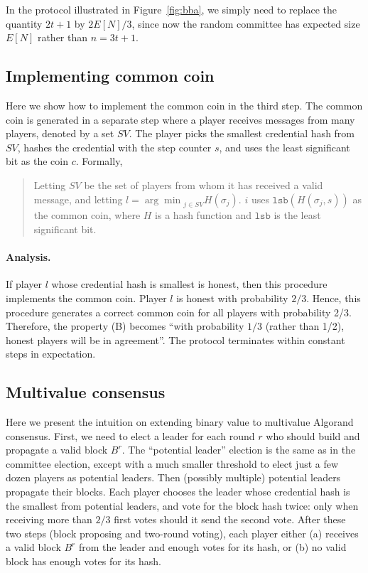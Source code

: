\documentclass{article}
\begin{document}
In the protocol illustrated in Figure~\ref{fig:bba}, we simply need to replace the quantity $2t+1$ by $2 E[N]/3$, since now the random committee has expected size $E[N]$ rather than $n=3t+1$.

\subsection*{Implementing common coin}
Here we show how to implement the common coin in the third step. The common coin is generated in a separate step where a player  receives messages from many players, denoted by a set $SV$. The player picks the smallest credential hash from $SV$, hashes the credential with the step counter $s$, and uses the least significant bit as the coin $c$. Formally,
\begin{quote}
    Letting $SV$ be the set of players from whom it has received a valid message, and letting $l={\arg\min}_{j\in SV} H(\sigma_j)$. $i$ uses $\texttt{lsb}(H(\sigma_j,s))$ as the common coin, where $H$ is a hash function and $\texttt{lsb}$ is the least significant bit.
\end{quote}

\paragraph{Analysis.} If player $l$ whose credential hash is smallest is honest, then this procedure implements the common coin. Player $l$ is honest with probability $2/3$. Hence, this procedure generates a correct common coin for all players with probability 2/3. Therefore, the property (B) becomes ``with probability $1/3$ (rather than 1/2), honest players will be in agreement''. The protocol terminates within constant steps in expectation.

\subsection*{Multivalue consensus}
Here we present the intuition on extending binary value to multivalue Algorand consensus. 
First, we need to elect a leader for each round $r$ who should build and propagate a valid block $B^r$. The ``potential leader'' election is the same as in the committee election, except with a much smaller threshold to elect just a few dozen players as potential leaders. 
Then (possibly multiple) potential leaders propagate their blocks. Each player chooses the leader whose credential hash is the smallest from potential leaders, and vote for the block hash twice: only when receiving more than $2/3$ first votes should it send the second vote. After these two steps (block proposing and two-round voting), each player either (a) receives a valid block $B^r$ from the leader and enough votes for its hash, or (b) no valid block has enough votes for its hash.
\end{document}
